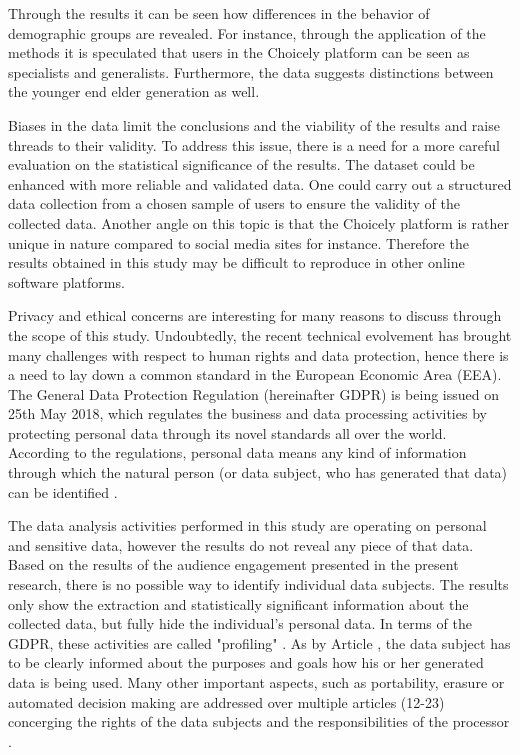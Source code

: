Through the results it can be seen how differences in the behavior of demographic groups are revealed. For instance, through the application of the methods it is speculated that users in the Choicely platform can be seen as specialists and generalists. Furthermore, the data suggests distinctions between the younger end elder generation as well. 

Biases in the data limit the conclusions and the viability of the results and raise threads to their validity. To address this issue, there is a need for a more careful evaluation on the statistical significance of the results. The dataset could be enhanced with more reliable and validated data. One could carry out a structured data collection from a chosen sample of users to ensure the validity of the collected data. Another angle on this topic is that the Choicely platform is rather unique in nature compared to social media sites for instance. Therefore the results obtained in this study may be difficult to reproduce in other online software platforms.

Privacy and ethical concerns are interesting for many reasons to discuss through the scope of this study. Undoubtedly, the recent technical evolvement has brought many challenges with respect to human rights and data protection, hence there is a need to lay down a common standard in the European Economic Area (EEA). The General Data Protection Regulation (hereinafter GDPR) \cite{gdpr} is being issued on 25th May 2018, which regulates the business and data processing activities by protecting personal data through its novel standards all over the world. According to the regulations, personal data means any kind of information through which the natural person (or data subject, who has generated that data) can be identified \cite{gdpr}. 

The data analysis activities performed in this study are operating on personal and sensitive data, however the results do not reveal any piece of that data. Based on the results of the audience engagement presented in the present research, there is no possible way to identify individual data subjects. The results only show the extraction and statistically significant information about the collected data, but fully hide the individual's personal data. In terms of the GDPR, these activities are called "profiling" \cite{gdpr}. As by Article \cite{gdpr}, the data subject has to be clearly informed about the purposes and goals how his or her generated data is being used. Many other important aspects, such as portability, erasure or automated decision making are addressed over multiple articles (12-23) concerging the rights of the data subjects and the responsibilities of the processor \cite{gdpr}.

